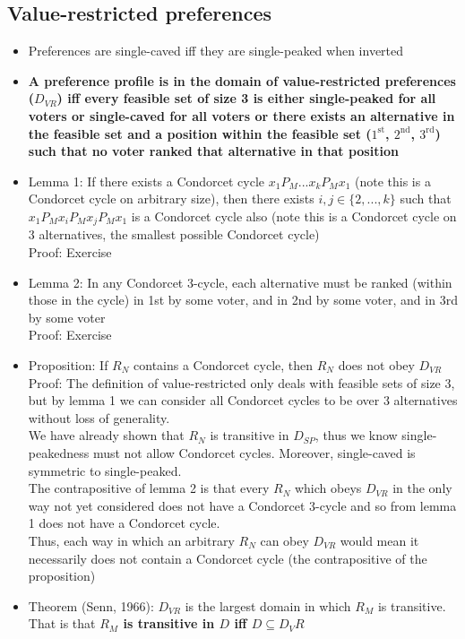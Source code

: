 \documentclass[20pt,a4paper,landscape]{extarticle}
\begin{document}
\begin{flushleft}
\subsection{Value-restricted preferences}
\begin{itemize}
\item Preferences are single-caved iff they are single-peaked when inverted
\item \textbf{A preference profile is in the domain of value-restricted preferences ($D_{VR}$) iff every feasible set of size 3 is either single-peaked for all voters or single-caved for all voters or there exists an alternative in the feasible set and a position within the feasible set ($1^\textrm{st}$, $2^\textrm{nd}$, $3^\textrm{rd}$) such that no voter ranked that alternative in that position}
\clearpage
\item Lemma 1: If there exists a Condorcet cycle $x_1 P_M ... x_k P_M x_1$ (note this is a Condorcet cycle on arbitrary size), then there exists $i, j \in \{2, ..., k\}$ such that $x_1 P_M x_i P_M x_j P_M x_1$ is a Condorcet cycle also (note this is a Condorcet cycle on 3 alternatives, the smallest possible Condorcet cycle)\\
Proof: Exercise
\item Lemma 2: In any Condorcet 3-cycle, each alternative must be ranked (within those in the cycle) in 1st by some voter, and in 2nd by some voter, and in 3rd by some voter\\
Proof: Exercise
\item Proposition: If $R_N$ contains a Condorcet cycle, then $R_N$ does not obey $D_{VR}$\\
Proof: The definition of value-restricted only deals with feasible sets of size 3, but by lemma 1 we can consider all Condorcet cycles to be over 3 alternatives without loss of generality.\\
We have already shown that $R_N$ is transitive in $D_{SP}$, thus we know single-peakedness must not allow Condorcet cycles. Moreover, single-caved is symmetric to single-peaked.\\
The contrapositive of lemma 2 is that every $R_N$ which obeys $D_{VR}$ in the only way not yet considered does not have a Condorcet 3-cycle and so from lemma 1 does not have a Condorcet cycle.\\
Thus, each way in which an arbitrary $R_N$ can obey $D_{VR}$ would mean it necessarily does not contain a Condorcet cycle (the contrapositive of the proposition)
\item Theorem (Senn, 1966): $D_{VR}$ is the largest domain in which $R_M$ is transitive. That is that \textbf{$R_M$ is transitive in $D$ iff $D \subseteq D_VR$}\\

\end{itemize}
\end{flushleft}
\end{document}
